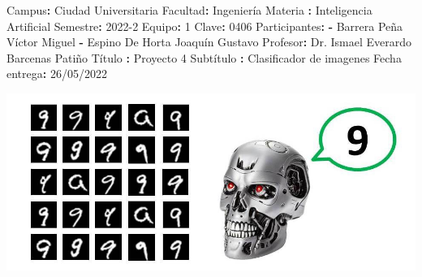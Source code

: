\documentclass[
  spanish,
  ignorenonframetext,
]{beamer}
\author{}
\date{}
\newenvironment{Shaded}{}{}
\newcommand{\AttributeTok}[1]{\textcolor[rgb]{0.49,0.56,0.16}{#1}}
\newcommand{\DecValTok}[1]{\textcolor[rgb]{0.25,0.63,0.44}{#1}}
\newcommand{\FunctionTok}[1]{\textcolor[rgb]{0.02,0.16,0.49}{#1}}
\newcommand{\KeywordTok}[1]{\textcolor[rgb]{0.00,0.44,0.13}{\textbf{#1}}}
\begin{document}
\begin{frame}[fragile]
\begin{Shaded}
\begin{Highlighting}[]
\FunctionTok{Campus}\KeywordTok{:}\AttributeTok{ Ciudad Universitaria}
\FunctionTok{Facultad}\KeywordTok{:}\AttributeTok{ Ingeniería}
\FunctionTok{Materia }\KeywordTok{:}\AttributeTok{ Inteligencia Artificial}
\FunctionTok{Semestre}\KeywordTok{:}\AttributeTok{ 2022{-}2}
\FunctionTok{Equipo}\KeywordTok{:}\AttributeTok{ }\DecValTok{1}
\FunctionTok{Clave}\KeywordTok{:}\AttributeTok{ }\DecValTok{0406}
\FunctionTok{Participantes}\KeywordTok{:}\AttributeTok{ }
\KeywordTok{{-}}\AttributeTok{ Barrera Peña Víctor Miguel}
\KeywordTok{{-}}\AttributeTok{ Espino De Horta Joaquín Gustavo}
\AttributeTok{    }
\FunctionTok{Profesor}\KeywordTok{:}\AttributeTok{ Dr. Ismael Everardo Barcenas Patiño}
\FunctionTok{Título }\KeywordTok{:}\AttributeTok{ Proyecto 4}
\FunctionTok{Subtítulo }\KeywordTok{:}\AttributeTok{ Clasificador de imagenes}
\FunctionTok{Fecha entrega}\KeywordTok{:}\AttributeTok{ 26/05/2022}
\end{Highlighting}
\end{Shaded}

\includegraphics[width=1.1\textwidth,height=\textheight]{img/README/portada.jpeg}

\pagebreak
\end{frame}
\end{document}
